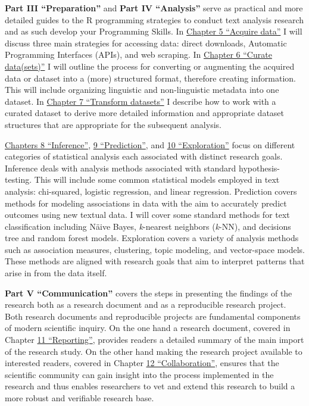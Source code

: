 \documentclass[
  letterpaper,
]{scrbook}
\begin{document}
\textbf{Part III ``Preparation''} and \textbf{Part IV ``Analysis''}
serve as practical and more detailed guides to the R programming
strategies to conduct text analysis research and as such develop your
Programming Skills. In \protect\hyperlink{acquire-data-chapter}{Chapter
5 ``Acquire data''} I will discuss three main strategies for accessing
data: direct downloads, Automatic Programming Interfaces (APIs), and web
scraping. In \protect\hyperlink{curate-datasets-chapter}{Chapter 6
``Curate data(sets)''} I will outline the process for converting or
augmenting the acquired data or dataset into a (more) structured format,
therefore creating information. This will include organizing linguistic
and non-linguistic metadata into one dataset. In
\protect\hyperlink{transform-datasets-chapter}{Chapter 7 ``Transform
datasets''} I describe how to work with a curated dataset to derive more
detailed information and appropriate dataset structures that are
appropriate for the subsequent analysis.

\protect\hyperlink{inference-chapter}{Chapters 8 ``Inference''},
\protect\hyperlink{prediction-chapter}{9 ``Prediction''}, and
\protect\hyperlink{exploration-chapter}{10 ``Exploration''} focus on
different categories of statistical analysis each associated with
distinct research goals. Inference deals with analysis methods
associated with standard hypothesis-testing. This will include some
common statistical models employed in text analysis: chi-squared,
logistic regression, and linear regression. Prediction covers methods
for modeling associations in data with the aim to accurately predict
outcomes using new textual data. I will cover some standard methods for
text classification including Näive Bayes, \emph{k}-nearest neighbors
(\emph{k}-NN), and decisions tree and random forest models. Exploration
covers a variety of analysis methods such as association measures,
clustering, topic modeling, and vector-space models. These methods are
aligned with research goals that aim to interpret patterns that arise in
from the data itself.

\textbf{Part V ``Communication''} covers the steps in presenting the
findings of the research both as a research document and as a
reproducible research project. Both research documents and reproducible
projects are fundamental components of modern scientific inquiry. On the
one hand a research document, covered in Chapter
\protect\hyperlink{reporting-chapter}{11 ``Reporting''}, provides
readers a detailed summary of the main import of the research study. On
the other hand making the research project available to interested
readers, covered in Chapter \protect\hyperlink{collaboration-chapter}{12
``Collaboration''}, ensures that the scientific community can gain
insight into the process implemented in the research and thus enables
researchers to vet and extend this research to build a more robust and
verifiable research base.
\end{document}
